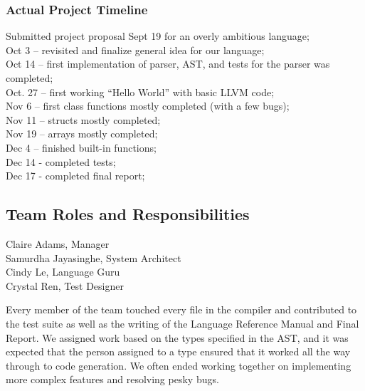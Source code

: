 \documentclass[12pt]{article}
\begin{document}
\subsubsection{Actual Project Timeline}
Submitted project proposal Sept 19 for an overly ambitious language;\\
Oct 3 -- revisited and finalize general idea for our language;\\
Oct 14 -- first implementation of parser, AST, and tests for the parser was completed;\\
Oct. 27 -- first working “Hello World” with basic LLVM code;\\
Nov 6 -- first class functions mostly completed (with a few bugs);\\
Nov 11 -- structs mostly completed;\\
Nov 19 -- arrays mostly completed;\\
Dec 4 -- finished built-in functions;\\
Dec 14 - completed tests;\\
Dec 17 - completed final report;\\

\subsection{Team Roles and Responsibilities}
Claire Adams, Manager \\
Samurdha Jayasinghe, System Architect\\ 
Cindy Le, Language Guru\\
Crystal Ren, Test Designer

Every member of the team touched every file in the compiler and contributed to the test suite as well as the writing of the Language Reference Manual and Final Report. We assigned work based on the types specified in the AST, and it was expected that the person assigned to a type ensured that it worked all the way through to code generation. We often ended working together on implementing more complex features and resolving pesky bugs. \\
\end{document}
